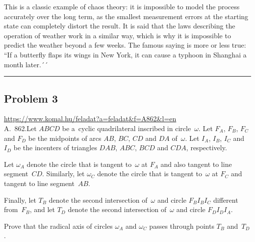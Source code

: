 \documentclass{article}
\begin{document}
This is a classic example of chaos theory: it is impossible to model the process accurately over the long term, as the smallest measurement errors at the starting state can completely distort the result. It is said that the laws describing the operation of weather work in a similar way, which is why it is impossible to predict the weather beyond a few weeks. The famous saying is more or less true: ``If a butterfly flaps its wings in New York, it can cause a typhoon in Shanghai a month later.´´

\vspace{1em}
\hrule
\vspace{1em}

\subsection*{Problem 3}
\noindent\url{https://www.komal.hu/feladat?a=feladat&f=A862&l=en}\\[1em]

A. 862.Let \(\displaystyle ABCD\) be a cyclic quadrilateral inscribed in circle \(\displaystyle \omega\). Let \(\displaystyle F_A\), \(\displaystyle F_B\), \(\displaystyle F_C\) and \(\displaystyle F_D\) be the midpoints of arcs \(\displaystyle AB\), \(\displaystyle BC\), \(\displaystyle CD\) and \(\displaystyle DA\) of \(\displaystyle \omega\). Let \(\displaystyle I_A\), \(\displaystyle I_B\), \(\displaystyle I_C\) and \(\displaystyle I_D\) be the incenters of triangles \(\displaystyle DAB\), \(\displaystyle ABC\), \(\displaystyle BCD\) and \(\displaystyle CDA\), respectively.

Let \(\displaystyle \omega_A\) denote the circle that is tangent to \(\displaystyle \omega\) at \(\displaystyle F_A\) and also tangent to line segment \(\displaystyle CD\). Similarly, let \(\displaystyle \omega_C\) denote the circle that is tangent to \(\displaystyle \omega\) at \(\displaystyle F_C\) and tangent to line segment \(\displaystyle AB\).

Finally, let \(\displaystyle T_B\) denote the second intersection of \(\displaystyle \omega\) and circle \(\displaystyle F_BI_BI_C\) different from \(\displaystyle F_B\), and let \(\displaystyle T_D\) denote the second intersection of \(\displaystyle \omega\) and circle \(\displaystyle F_DI_DI_A\).

Prove that the radical axis of circles \(\displaystyle \omega_A\) and \(\displaystyle \omega_C\) passes through points \(\displaystyle T_B\) and \(\displaystyle T_D\).
\end{document}
